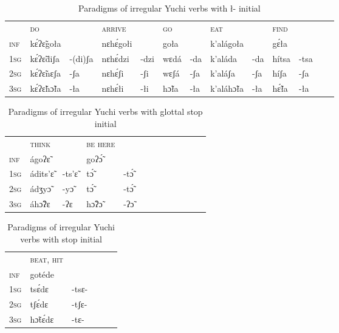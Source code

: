 \documentclass[oneside,a4paper,11pt]{article}
\newcommand{\ipa}[1]{{\phon#1}} %
\begin{document}
\begin{table}[H]
\caption{Paradigms of irregular Yuchi verbs with \ipa{ł-} initial} \label{tab:yuchi.l} \centering
\begin{tabular}{lllllllllllll}
\toprule
\textsc{} &	\textsc{do} &	\textsc{} &	\textsc{arrive} &	\textsc{} &	\textsc{go} &	\textsc{} &	\textsc{eat} &	\textsc{} &	\textsc{find} &	\textsc{} &	\\
\textsc{inf} &	\ipa{kɛ́ʔɛ̃goła} &	\ipa{} &	\ipa{nɛhɛ́gołi} &	\ipa{} &	\ipa{goła} &	\ipa{} &	\ipa{k'alágoła} &	\ipa{} &	\ipa{gɛ́ła} &	\ipa{} &	\\
\textsc{1sg} &	\ipa{kɛ́ʔɛ̃diʃa} &	\ipa{-(di)ʃa} &	\ipa{nɛhɛ́dzi} &	\ipa{-dzi} &	\ipa{wɛdá} &	\ipa{-da} &	\ipa{k'aláda} &	\ipa{-da} &	\ipa{hítsa} &	\ipa{-tsa} &	\\
\textsc{2sg} &	\ipa{kɛ́ʔɛ̃nɛʃa} &	\ipa{-ʃa} &	\ipa{nɛhɛ́ʃi} &	\ipa{-ʃi} &	\ipa{wɛʃá} &	\ipa{-ʃa} &	\ipa{k'aláʃa} &	\ipa{-ʃa} &	\ipa{híʃa} &	\ipa{-ʃa} &	\\
\textsc{3sg} &	\ipa{kɛ́ʔɛ̃hɔ̃ła} &	\ipa{-ła} &	\ipa{nɛhɛ́łi} &	\ipa{-łi} &	\ipa{hɔ̃ła} &	\ipa{-ła} &	\ipa{k'aláhɔ̃ła} &	\ipa{-ła} &	\ipa{hɛ̃́ła} &	\ipa{-ła} &	\\
\bottomrule
\end{tabular}
\end{table}



\begin{table}[H]
\caption{Paradigms of irregular Yuchi verbs with glottal stop initial} \label{tab:yuchi.glottal} \centering
\begin{tabular}{lllllllllllll}
\toprule
\textsc{} &	\textsc{think} &	\textsc{} &	\textsc{be here} &	\textsc{} &	\\	
\textsc{inf} &	\ipa{ágoʔɛ̃} &	\ipa{} &	\ipa{goʔɔ̃́} &	\ipa{} &	\\	
\textsc{1sg} &	\ipa{ádits'ɛ̃} &	\ipa{-ts'ɛ̃} &	\ipa{tɔ̃́} &	\ipa{-tɔ̃́} &	\\	
\textsc{2sg} &	\ipa{ádʒyɔ̃} &	\ipa{-yɔ̃} &	\ipa{tɔ̃́} &	\ipa{-tɔ̃́} &	\\	
\textsc{3sg} &	\ipa{áhɔ̃ʔɛ} &	\ipa{-ʔɛ} &	\ipa{hɔ̃ʔɔ̃} &	\ipa{-ʔɔ̃} &	\\	
\bottomrule
\end{tabular}
\end{table}
 
\begin{table}[H]
\caption{Paradigms of irregular Yuchi verbs with stop initial} \label{tab:yuchi.stop} \centering
\begin{tabular}{llllll}
\toprule
\textsc{} &	\textsc{beat, hit} &	\textsc{} &	\\	
\textsc{inf} &	\ipa{gotéde} &	\ipa{} &	\\	
\textsc{1sg} &	\ipa{tsɛ́dɛ} &	\ipa{-tsɛ-} &	\\	
\textsc{2sg} &	\ipa{tʃɛ́dɛ} &	\ipa{-tʃɛ-} &	\\	
\textsc{3sg} &	\ipa{hɔ̃tɛ́dɛ} &	\ipa{-tɛ-} &	\\	
\bottomrule
\end{tabular}
\end{table}
\end{document}
